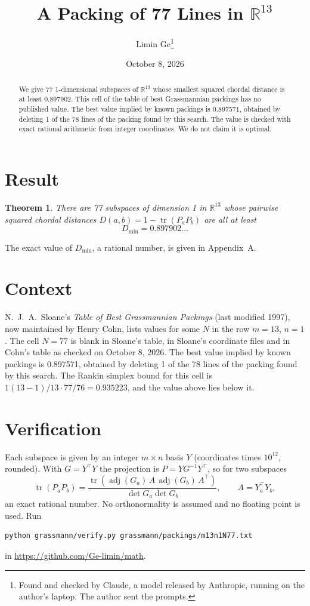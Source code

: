\documentclass[11pt,a4paper]{article}
\title{A Packing of 77 Lines in $\mathbb{R}^{13}$}
\author{Limin Ge\thanks{Found and checked by Claude, a model released by Anthropic, running on the author's laptop. The author sent the prompts.}}
\date{October 8, 2026}
\newtheorem*{theorem}{Theorem}
\begin{document}
\maketitle
\begin{abstract}
We give 77 1-dimensional subspaces of $\mathbb{R}^{13}$ whose smallest squared chordal distance is at least 0.897902. This cell of the table of best Grassmannian packings has no published value. The best value implied by known packings is 0.897571, obtained by deleting 1 of the 78 lines of the packing found by this search. The value is checked with exact rational arithmetic from integer coordinates. We do not claim it is optimal.
\end{abstract}

\section{Result}
\begin{theorem}
There are 77 subspaces of dimension 1 in $\mathbb{R}^{13}$ whose pairwise squared chordal distances $D(a,b) = 1 - \operatorname{tr}(P_aP_b)$ are all at least
\[ D_{\min} = 0.897902\ldots \]
\end{theorem}
The exact value of $D_{\min}$, a rational number, is given in Appendix~A.


\section{Context}
N.~J.~A.~Sloane's \emph{Table of Best Grassmannian Packings} (last modified 1997), now maintained by Henry Cohn, lists values for some $N$ in the row $m=13$, $n=1$. The cell $N=77$ is blank in Sloane's table, in Sloane's coordinate files and in Cohn's table as checked on October 8, 2026. The best value implied by known packings is 0.897571, obtained by deleting 1 of the 78 lines of the packing found by this search. The Rankin simplex bound for this cell is $1(13-1)/13\cdot 77/76 = 0.935223$, and the value above lies below it.


\section{Verification}
Each subspace is given by an integer $m\times n$ basis $Y$ (coordinates times $10^{12}$, rounded). With $G=Y^\top Y$ the projection is $P=YG^{-1}Y^\top$, so for two subspaces
\[ \operatorname{tr}(P_aP_b)=\frac{\operatorname{tr}(\operatorname{adj}(G_a)\,A\,\operatorname{adj}(G_b)\,A^\top)}{\det G_a\det G_b},\qquad A=Y_a^\top Y_b, \]
an exact rational number. No orthonormality is assumed and no floating point is used. Run
\begin{verbatim}
python grassmann/verify.py grassmann/packings/m13n1N77.txt
\end{verbatim}
in \url{https://github.com/Ge-limin/math}.
\end{document}

